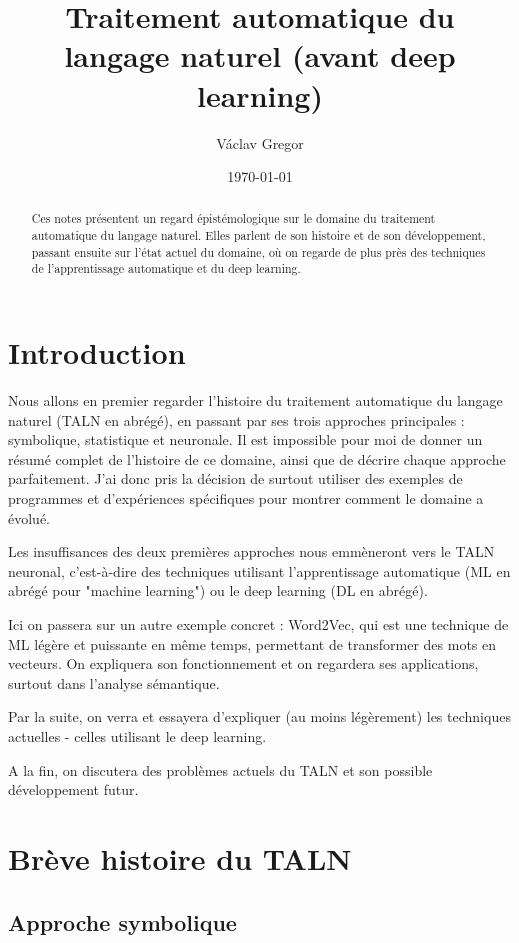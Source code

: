 \documentclass[11pt, a4paper]{report}
\title{Traitement automatique du langage naturel \newline
(avant deep learning)}
\author{Václav Gregor}
\date{\today}
\begin{document}
\maketitle

\tableofcontents


\begin{abstract}
  Ces notes présentent un regard épistémologique sur le domaine du traitement automatique du 
  langage naturel. Elles parlent de son histoire et de son développement, passant ensuite 
  sur l'état actuel du domaine, où on regarde de plus près 
  des techniques de l'apprentissage automatique et du deep learning.
\end{abstract}


\chapter{Introduction}
  Nous allons en premier regarder l'histoire du traitement automatique du langage 
  naturel (TALN en abrégé), en passant par ses 
  trois approches principales : symbolique, statistique et neuronale. 
  Il est impossible pour moi de donner un résumé complet de l'histoire de ce domaine, 
  ainsi que de décrire chaque approche parfaitement. J'ai donc pris la décision de surtout 
  utiliser des exemples de programmes et d'expériences spécifiques pour montrer 
  comment le domaine a évolué. 

  Les insuffisances des deux premières approches nous emmèneront vers le TALN neuronal, 
  c'est-à-dire des techniques utilisant l'apprentissage automatique (ML en abrégé pour "machine learning") ou 
  le deep learning (DL en abrégé).  
  
  Ici on passera sur un autre exemple concret : Word2Vec, qui est une technique de ML légère et 
  puissante en même temps, permettant de transformer des mots en vecteurs. 
  On expliquera son fonctionnement et on regardera ses applications, surtout dans l'analyse
  sémantique.

  Par la suite, on verra et essayera d'expliquer (au moins légèrement) les techniques actuelles - celles utilisant le deep learning.  
  
  A la fin, on discutera des problèmes actuels du TALN et son possible développement futur.  
\chapter{Brève histoire du TALN}
  \section{Approche symbolique}
\end{document}
